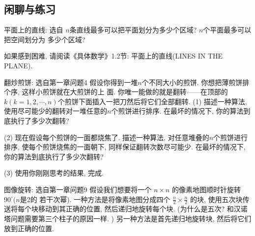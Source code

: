\subsection*{闲聊与练习} 

    \begin{exercise}{平面上的直线: 选自\cite{knuth1989concrete}}
        $n$条直线最多可以把平面划分为多少个区域? $n$个平面最多可以把空间划分为
        多少个区域? 

        如果感到困难, 请阅读《具体数学》1.2节: 平面上的直线(LINES IN THE PLANE).
    \end{exercise}

    \begin{exercise}{翻炒煎饼: 选自\cite{algobook}第一章问题4}
    假设你得到一堆$n$个不同大小的煎饼. 你想把薄煎饼排个序, 这样小煎饼就在大煎饼的上
    面. 你唯一能做的就是翻转——在顶部的$k(k=1,2,\cdots, n)$个煎饼下面插入一把刀然后将它们全部翻转. 
    (1) 描述一种算法, 使用尽可能少的翻转对一堆任意的$n$个煎饼进行排序. 在最坏的情况下, 你的算法到底执行了多少次翻转? 
    
    (2) 现在假设每个煎饼的一面都烧焦了. 描述一种算法, 对任意堆叠的$n$个煎饼进行排序, 使每个煎饼烧焦的一面朝下, 同样保证翻转次数尽可能少. 在最坏的情况下, 你的算法到底执行了多少次翻转? 
    
    (3) 使用你刚刚思考的结果, 完成. 
    \end{exercise}

    \begin{exercise}{图像旋转: 选自\cite{algobook}第一章问题9}
        假设我们想要将一个 $n \times n$ 的像素地图顺时针旋转 $90^\circ$($n$是2的
        若干次幂). 一种方法是将像素地图分成四个 $\frac{n}{2} \times \frac{n}{2}$ 
        的块, 使用五次块传送将每个块移动到其正确的位置, 然后递归地旋转每个块. 
         (为什么是五次? 和汉诺塔问题需要第三个柱子的原因一样. ) 
        另一种方法是首先递归地旋转块, 然后将它们放到正确的位置. 
        
        
    \end{exercise}

